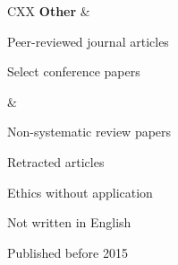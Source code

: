 \begin{tabularx}{\textwidth}{CXX}
\textbf{Other} & 
\begin{tablelist}
    \item Peer-reviewed journal articles
    \item Select conference papers
    \item 
\end{tablelist} & 
\begin{tablelist}
    \item Non-systematic review papers
    \item Retracted articles
    \item Ethics without application
    \item Not written in English
    \item Published before 2015
    \item 
\end{tablelist} \\ \hline

\end{tabularx}